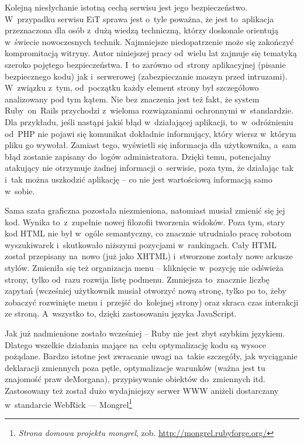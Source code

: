 \documentclass[a4paper,12pt,oneside]{report}
\begin{document}
Kolejną niesłychanie istotną cechą serwisu jest jego bezpieczeństwo. W~przypadku serwisu EiT sprawa jest o~tyle poważna, że jest to~aplikacja przeznaczona dla osób z~dużą wiedzą techniczną, którzy doskonale orientują w~świecie nowoczesnych technik. Najmniejsze niedopatrzenie może się zakończyć kompromitacją witryny. Autor niniejszej pracy od~wielu lat zajmuje się tematyką szeroko pojętego bezpieczeństwa. I~to zarówno od~strony aplikacyjnej (pisanie bezpiecznego kodu) jak i~serwerowej (zabezpieczanie maszyn przed intruzami). W~związku z~tym, od~początku każdy element strony był szczegółowo analizowany pod tym kątem. Nie bez znaczenia jest też fakt, że system Ruby~on~Rails przychodzi z~wieloma rozwiązaniami ochronnymi w~standardzie. Dla przykładu, jeśli nastąpi jakiś błąd w~działającej aplikacji, to~w~odróżnieniu od~PHP nie pojawi się komunikat dokładnie informujący, który wiersz w~którym pliku go wywołał. Zamiast tego, wyświetli się informacja dla użytkownika, a~sam błąd zostanie zapisany do~logów administratora. Dzięki temu, potencjalny atakujący nie otrzymuje żadnej informacji o~serwisie, poza tym, że działając tak i~tak można uszkodzić aplikację -- co nie jest wartościową informacją samo w~sobie.

Sama szata graficzna pozostała niezmieniona, natomiast musiał zmienić się jej kod. Wynika to~z~zupełnie nowej filozofii tworzenia widoków. Poza tym, stary kod HTML nie był w~ogóle semantyczny, co znacznie utrudniało pracę robotom wyszukiwarek i~skutkowało niższymi pozycjami w~rankingach. Cały HTML został przepisany na~nowo (już jako XHTML) i~stworzone zostały nowe arkusze stylów. Zmieniła się też organizacja menu -- kliknięcie w~pozycję nie odświeża strony, tylko od~razu rozwija listę podmenu. Zmniejsza to~znacznie liczbę zapytań (wcześniej użytkownik musiał otworzyć nową stronę, tylko po to, żeby zobaczyć rozwinięte menu i~przejść do~kolejnej strony) oraz skraca czas interakcji ze stroną. A~wszystko to, dzięki zastosowaniu języka JavaScript.

Jak już nadmienione zostało wcześniej -- Ruby nie jest zbyt szybkim językiem. Dlatego wszelkie działania mające na~celu optymalizację kodu są wysoce pożądane. Bardzo istotne jest zwracanie uwagi na~takie szczegóły, jak wyciąganie deklaracji zmiennych poza pętle, optymalizacje warunków (ważna jest tu znajomość praw deMorgana), przypisywanie obiektów do~zmiennych itd. Zastosowany też został dużo wydajniejszy serwer WWW aniżeli dostarczany w~standarcie WebRick --- Mongrel\footnote{\emph{Strona domowa projektu mongrel}, zob. \url{http://mongrel.rubyforge.org/}}
\end{document}
